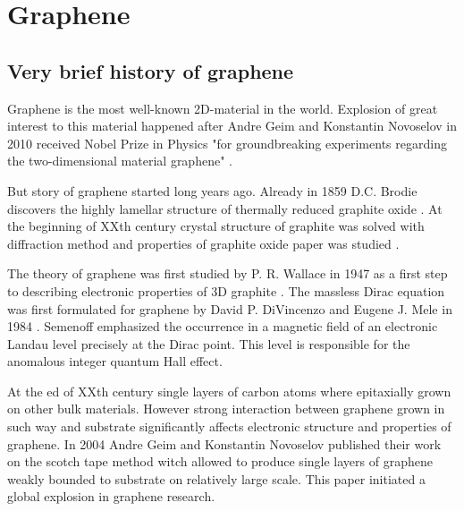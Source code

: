\chapter{Graphene}
\section{Very brief history of graphene}
Graphene is the most well-known 2D-material in the world.  Explosion of great interest to this material happened after Andre Geim and Konstantin Novoselov in 2010 received Nobel Prize in Physics "for groundbreaking experiments regarding the two-dimensional material graphene" \cite{geim}. 

But story of graphene started long years ago. Already in 1859 D.C. Brodie discovers the highly lamellar structure of thermally reduced graphite oxide \cite{brodie}. At the beginning of XXth century crystal structure of graphite was solved with diffraction method \cite{debije, bernal} and properties of graphite oxide paper was studied \cite{haenni}.

The theory of graphene was first studied by P. R. Wallace in 1947 as a first step to describing electronic properties of 3D graphite \cite{wallace}. The massless Dirac equation was first formulated for graphene by David P. DiVincenzo and Eugene J. Mele in 1984 \cite{divincenzo}. Semenoff emphasized the occurrence in a magnetic field of an electronic Landau level precisely at the Dirac point. This level is responsible for the anomalous integer quantum Hall effect.

At the ed of XXth century single layers of carbon atoms where epitaxially grown on other bulk materials\cite{epitaxial}. However strong interaction between graphene grown in such way and substrate significantly affects electronic structure and properties of graphene. In 2004 Andre Geim and Konstantin Novoselov published their work on the scotch tape method witch allowed to produce single layers of graphene weakly bounded to substrate on relatively large scale\cite{geim-science}. This paper initiated a global explosion in graphene research.

